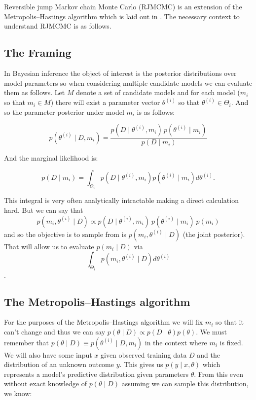 \documentclass[10pt]{article}
\begin{document}
Reversible jump Markov chain Monte Carlo (RJMCMC) is an extension of the Metropolis–Hastings algorithm which is laid out in \textcite{hastings1970monte}. The necessary context to understand RJMCMC is as follows.

\subsection{The Framing}
In Bayesian inference the object of interest is the posterior distributions over model parameters so when considering multiple candidate models we can evaluate them as follows. Let \(M\) denote a set of candidate models and for each model (\(m_i\) so that \(m_i \in M\))  there will exist a parameter vector \(\theta^{(i)}\) so that \(\theta^{(i)} \in \Theta_i \). And so the parameter posterior under model \(m_i\) is as follows: 


\[p(\theta^{(i)}\mid D, m_i)
=
\frac{p(D\mid\theta^{(i)},m_i)\,p(\theta^{(i)}\mid m_i)}
{p(D\mid m_i)}\]

And the marginal likelihood is:

\[p(D\mid m_i)
=
\int_{\Theta_i}
p(D\mid\theta^{(i)},m_i)
p(\theta^{(i)}\mid m_i)
d\theta^{(i)}.\]

This integral is very often analytically intractable making a direct calculation hard. But we can say that \[p(m_i,\theta^{(i)}\mid D) \propto p(D\mid\theta^{(i)},m_i)\ p(\theta^{(i)}\mid m_i)\ p(m_i)\]
and so the objective is to sample from is \(p(m_i,\theta^{(i)}\mid D)\) (the joint posterior).
That will allow us to evaluate \(p(m_i\mid D)\) via \[\int_{\Theta_i} p(m_i,\theta^{(i)}\mid D) d\theta^{(i)}\]. 

\subsection{The Metropolis–Hastings algorithm}
For the purposes of the Metropolis–Hastings algorithm we will fix \(m_i\) so that it can't change and thus we can say \(p(\theta\mid D)\propto p(D\mid\theta) p(\theta)\). We must remember that \(p(\theta\mid D) \equiv p(\theta^{(i)}\mid D,m_i)\) in the context where \(m_i\) is fixed. We will also have some input \(x\) given observed training data \(D\) and the distribution of an unknown outcome \(y\). This gives us \(p(y \mid x, \theta)\) which represents a model’s predictive distribution given parameters \(\theta\). From this even without exact knowledge of \(p(\theta \mid D)\) assuming we can sample this distribution, we know:
\end{document}
